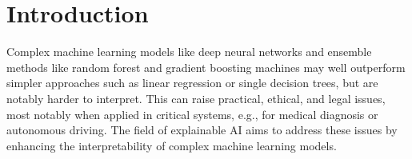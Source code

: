 \documentclass{article}
\begin{document}
%






%


\section{Introduction}

Complex machine learning models like deep neural networks and ensemble methods like random forest and gradient boosting machines may well outperform simpler approaches such as linear regression or single decision trees, but are notably harder to interpret. This can raise practical, ethical, and legal issues, most notably when applied in critical systems, e.g., for medical diagnosis or autonomous driving. The field of explainable AI aims to address these issues by enhancing the interpretability of complex machine learning models.
\end{document}
